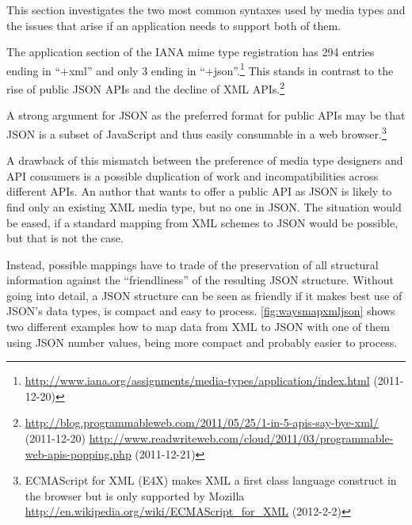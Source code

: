 \documentclass[12pt,a4paper,twoside]{scrartcl}		%
\newcommand{\citeurl}[2]{\url{#1} (#2)}
\begin{document}

This section investigates the two most common syntaxes used by media types
and the issues that arise if an application needs to support both of them.

The application section of the IANA mime type registration has 294 entries
ending in ``+xml'' and only 3 ending in
``+json''.\footnote{\citeurl{http://www.iana.org/assignments/media-types/application/index.html}{2011-12-20}}
This stands in contrast to the rise of public JSON APIs and the decline of XML
APIs.\footnote{\citeurl{http://blog.programmableweb.com/2011/05/25/1-in-5-apis-say-bye-xml/}{2011-12-20} \citeurl{http://www.readwriteweb.com/cloud/2011/03/programmable-web-apis-popping.php}{2011-12-21}}

A strong argument for JSON as the preferred format for public APIs may be that
JSON is a subset of JavaScript and thus easily consumable in a web
browser.\footnote{ECMAScript for XML (E4X) makes XML a first class language
  construct in the browser but is only supported by Mozilla
  \citeurl{http://en.wikipedia.org/wiki/ECMAScript_for_XML}{2012-2-2}}

A drawback of this mismatch between the preference of media type designers and
API consumers is a possible duplication of work and incompatibilities across
different APIs. An author that wants to offer a public API as JSON is likely to
find only an existing XML media type, but no one in JSON.  The situation would
be eased, if a standard mapping from XML schemes to JSON would be possible, but
that is not the case.

Instead, possible mappings have to trade of the preservation of all structural
information against the ``friendliness'' of the resulting JSON
structure\cite{Boyer2011}. Without going into detail, a JSON structure can be
seen as friendly if it makes best use of JSON's data types, is compact and easy
to process. \autoref{fig:waysmapxmljson} shows two different examples how to map
data from XML to JSON with one of them using JSON number values, being more
compact and probably easier to process.
\end{document}
